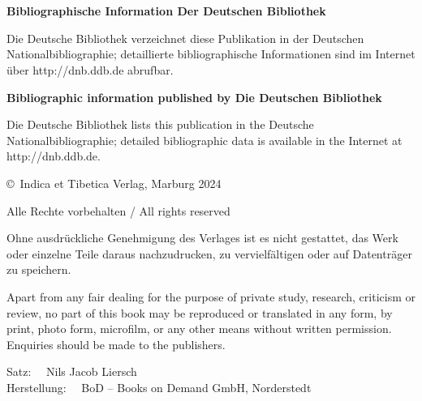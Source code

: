 \newpage
\newpage \ \thispagestyle{empty}
\small  \

\noindent

\
\vfill


\small
\noindent \textbf{Bibliographische Information Der Deutschen Bibliothek}

\noindent
Die Deutsche Bibliothek verzeichnet diese Publikation in der Deutschen Nationalbibliographie;
detaillierte bibliographische Informationen sind im Internet über http://dnb.ddb.de abrufbar.

\noindent
\textbf{Bibliographic information published by Die Deutschen Bibliothek}

\noindent
Die Deutsche Bibliothek lists this publication in the Deutsche Nationalbibliographie; detailed
bibliographic data is available in the Internet at http://dnb.ddb.de.  


\vskip 1cm

\noindent
\copyright\ Indica et Tibetica Verlag, Marburg 2024

\medskip

\noindent
Alle Rechte vorbehalten / All rights reserved

\medskip

\noindent
Ohne ausdrückliche Genehmigung des Verlages ist es nicht gestattet, das Werk oder einzelne Teile
daraus nachzudrucken, zu vervielfältigen oder auf Datenträger zu speichern.

\smallskip

\noindent
Apart from any fair dealing for the purpose of private study, research, criticism or review, no
part of this book may be reproduced or translated in any form, by print, photo form, microfilm, or
any other means without written permission. Enquiries should be made to the publishers.

\bigskip

\noindent
Satz: \ \ Nils Jacob Liersch \\
Herstellung: \ \ BoD – Books on Demand GmbH, Norderstedt  \\

\bigskip

\noindent

\normalsize

\newpage

\clearpage
\tableofcontents
\addtocounter{page}{-1}
\thispagestyle{empty}
\clearpage


